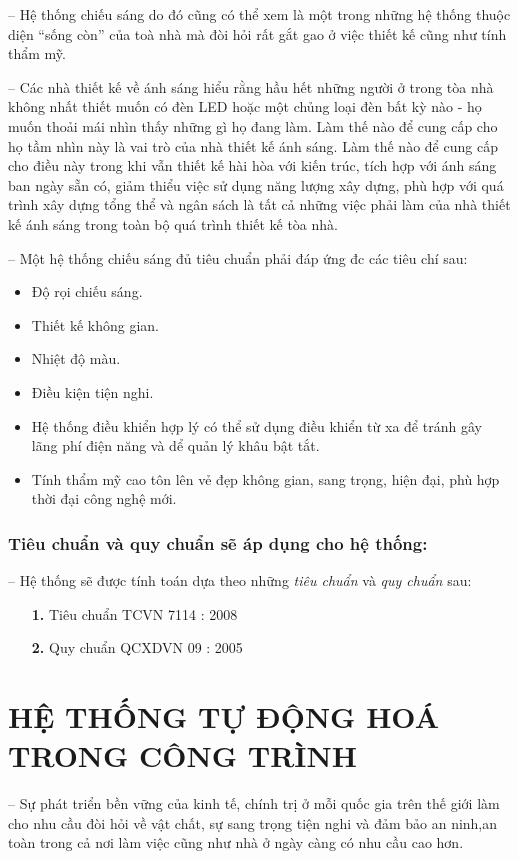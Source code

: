 	-- Hệ thống chiếu sáng do đó cũng có thể xem là một trong những hệ thống thuộc diện ``sống còn'' của toà nhà mà đòi hỏi rất gắt gao ở việc thiết kế cũng như tính thẩm mỹ.
	
	-- Các nhà thiết kế về ánh sáng hiểu rằng hầu hết những người ở trong tòa nhà không nhất thiết muốn có đèn LED hoặc một chủng loại đèn bất kỳ nào - họ muốn thoải mái nhìn thấy những gì họ đang làm. Làm thế nào để cung cấp cho họ tầm nhìn này là vai trò của nhà thiết kế ánh sáng. Làm thế nào để cung cấp cho điều này trong khi vẫn thiết kế hài hòa với kiến trúc, tích hợp với ánh sáng ban ngày sẵn có, giảm thiểu việc sử dụng năng lượng xây dựng, phù hợp với quá trình xây dựng tổng thể và ngân sách là tất cả những việc phải làm của nhà thiết kế ánh sáng trong toàn bộ quá trình thiết kế tòa nhà.
	
	-- Một hệ thống chiếu sáng đủ tiêu chuẩn phải đáp ứng đc các tiêu chí sau:
	\begin{itemize}[leftmargin=2.5cm]
		\item Độ rọi chiếu sáng.
		\item Thiết kế không gian.
		\item Nhiệt độ màu.
		\item Điều kiện tiện nghi.
		\item Hệ thống điều khiển hợp lý có thể sử dụng điều khiển từ xa để tránh gây lãng phí điện năng và dể quản lý khâu bật tắt.
		\item Tính thẩm mỹ cao tôn lên vẻ đẹp không gian, sang trọng, hiện đại, phù hợp thời đại công nghệ mới.
	\end{itemize}
	\subsubsection{Tiêu chuẩn và quy chuẩn sẽ áp dụng cho hệ thống:}		
	-- Hệ thống sẽ được tính toán dựa theo những \emph{tiêu chuẩn} và \emph{quy chuẩn} sau:
	\begin{itemize}
		\item[\textbf{1.}]Tiêu chuẩn TCVN 7114 : 2008 
		\item[\textbf{2.}]Quy chuẩn QCXDVN 09 : 2005
	\end{itemize}	
	
	\section{HỆ THỐNG TỰ ĐỘNG HOÁ TRONG CÔNG TRÌNH}
	-- Sự phát triển bền vững của kinh tế, chính trị ở mỗi quốc gia trên thế giới làm cho nhu cầu đòi hỏi về vật chất, sự sang trọng tiện nghi và đảm bảo an ninh,an toàn trong cả nơi làm việc cũng như nhà ở ngày càng có nhu cầu cao hơn.

